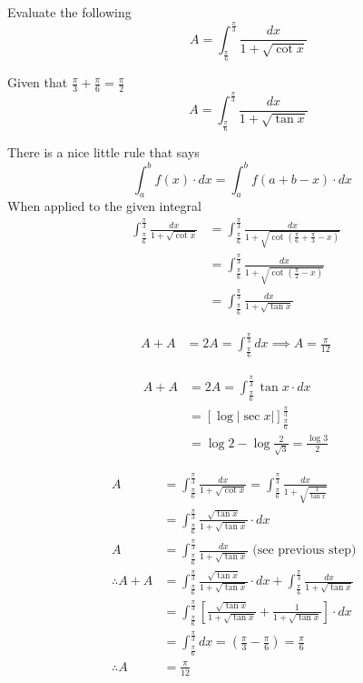 \documentclass[14pt,fleqn]{extarticle}
\begin{document}
\newcommand\intg{\int_{\frac{\pi}{6}}^{\frac{\pi}{3}}}
\newcommand\ea{ 1 + \sqrt{\cot x}}
\newcommand\eb{ \frac{\sqrt{\tan x}}{1+\sqrt{\tan x}} }
\begin{question}
	\statement 
    
     Evaluate the following
     \[ \qquad A = \intg \frac{dx}{\ea} \]
     
     \begin{step}
  \begin{options} 
     \correct 
      
      Given that $\frac\pi{3} + \frac\pi{6} = \frac\pi{2}$ 
      \[ \qquad A = \intg \frac{dx}{1+\sqrt{\tan x}} \]
        
    \end{options} 
     \reason 
     
     There is a nice little rule that says 
     \[ \quad \int_a^b f(x)\cdot dx = \int_a^b f \left(a+b-x \right)\cdot dx \]
     When applied to the given integral 
     \begin{align}
	   \intg \frac{dx}{\ea} &= \intg \frac{dx}{1+\sqrt{\cot \left(\frac\pi{6}+\frac\pi{3} -x \right)}} \\
	   &= \intg \frac{dx}{1 + \sqrt{\cot \left(\frac\pi{2} - x \right)}} \\
	   &= \intg \frac{dx}{1+\sqrt{\tan x}}
\end{align}
       
\end{step}

\begin{step}
  \begin{options} 
     \correct 
      
      \begin{align}
	      A + A &= 2A = \intg dx \implies A = \frac{\pi}{12}
\end{align}
     \incorrect
      
      \begin{align}
	A + A &= 2A = \intg \tan x \cdot dx \\
	&= \left[\log \vert \sec x \vert \right]_{\frac\pi{6}}^{\frac\pi{3}} \\
	&= \log 2 - \log \frac{2}{\sqrt{3}} = \frac{\log 3}{2} 
\end{align}  
    \end{options} 
     \reason 
     
     \begin{align}
	    A &= \intg \frac{dx}{\ea} = \intg \frac{dx}{1 + \sqrt{\frac{1}{\tan x}}} \\
	     &= \intg \eb\cdot dx \\
	     A &= \intg \frac{dx}{1 + \sqrt{\tan x}}\text{ (see previous step) } \\
	     \therefore A + A &= \intg \eb\cdot dx + \intg \frac{dx}{1+\sqrt{\tan x}} \\
	     &= \intg \left[\eb + \frac{1}{1+\sqrt{\tan x}} \right]\cdot dx \\
	     &= \intg dx = \left(\frac\pi{3} - \frac\pi{6} \right) = \frac\pi{6} \\
	     \therefore A &= \frac\pi{12} 
\end{align}  
       
\end{step}
\end{question} 
\end{document}
